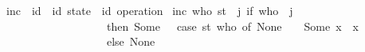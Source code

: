 \begin{isabellebody}
\isamarkupfalse%
\ inc\ {\isacharcolon}{\isacharcolon}\ {\isachardoublequoteopen}{\isacharprime}id\ {\isasymRightarrow}\ {\isacharparenleft}{\isacharprime}id\ state{\isacharparenright}\ {\isasymRightarrow}\ {\isacharparenleft}{\isacharprime}id\ operation{\isacharparenright}{\isachardoublequoteclose}\ \isanewline
{\isachardoublequoteopen}inc\ who\ st\ {\isacharequal}\ {\isacharparenleft}{\isasymlambda}j{\isachardot}\ if\ who\ {\isacharequal}\ j\isanewline
\ \ \ \ \ \ \ \ \ \ \ \ \ \ \ \ \ \ \ then\ Some\ {\isacharparenleft}{}\ {\isacharplus}\ {\isacharparenleft}case\ {\isacharparenleft}st\ who{\isacharparenright}\ of\ None\ {\isasymRightarrow}\ {}\ {\isacharbar}\ Some\ {\isacharparenleft}x{\isacharparenright}\ {\isasymRightarrow}\ x{\isacharparenright}{\isacharparenright}\isanewline
\ \ \ \ \ \ \ \ \ \ \ \ \ \ \ \ \ \ \ else\ None{\isacharparenright}{\isachardoublequoteclose}
\end{isabellebody}
